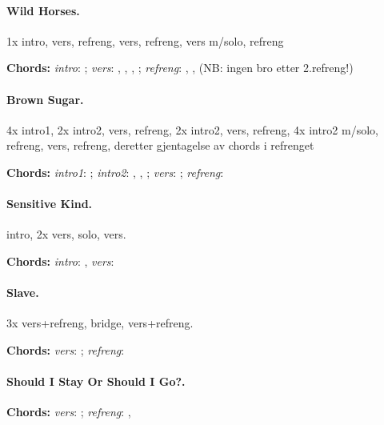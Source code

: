 \documentclass[%
twoside,                 %
draft,                   %
final,                   %
10pt]{article}
\begin{document}
\paragraph{Wild Horses.}
1x intro, vers, refreng, vers, refreng, vers m/solo, refreng

\textbf{Chords:} \emph{intro}: ;
\emph{vers}: , , , ;
\emph{refreng}: , , 
(NB: ingen bro etter 2.refreng!)





\paragraph{Brown Sugar.}
4x intro1, 2x intro2, vers, refreng, 2x intro2, vers, refreng, 4x intro2 m/solo, refreng, vers, refreng, deretter gjentagelse av chords i refrenget

\textbf{Chords:} \emph{intro1}: ; \emph{intro2}: , , ;
\emph{vers}: ; \emph{refreng}: 




\paragraph{Sensitive Kind.}
intro, 2x vers, solo, vers.

\textbf{Chords:} \emph{intro}: , \emph{vers}: 





\paragraph{Slave.}
3x vers+refreng, bridge, vers+refreng.

\textbf{Chords:} \emph{vers}: ; \emph{refreng}: 




\paragraph{Should I Stay Or Should I Go?.}
\textbf{Chords:} \emph{vers}: ; \emph{refreng}: , 
\end{document}
